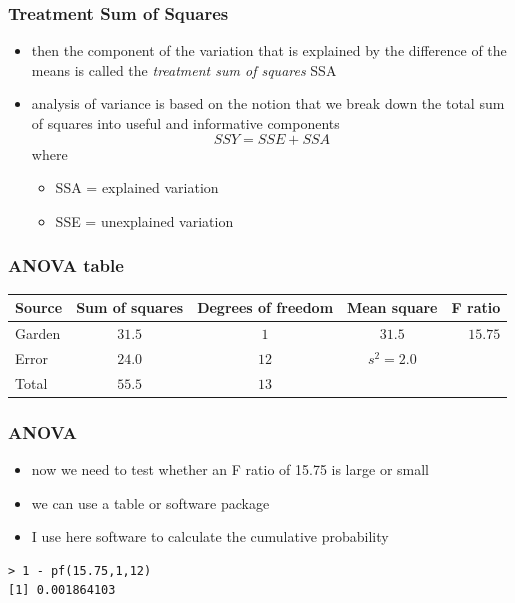 \begin{frame}\frametitle{Treatment Sum of Squares}
\begin{itemize}
  \item then the component of the variation that is explained by the difference of the means is called the \emph{treatment sum of squares} SSA
  \item analysis of variance is based  on the notion that we break down the total sum of squares into useful and informative components
$$SSY=SSE+SSA$$ where
    \begin{itemize}
      \item SSA = explained variation
      \item SSE = unexplained variation
    \end{itemize}

  \end{itemize}
\end{frame}

\begin{frame}\frametitle{ANOVA table}
\begin{center}
\small
\begin{tabular}{@{} >{\ttfamily}l cccr}
\hline
Source & Sum of squares & Degrees of freedom & Mean square & F ratio \\
\hline
Garden &  $31.5$ & $1$ &  $31.5$ &  $15.75$\\
Error &  $24.0$ & $12$ &  $s^2=2.0$ &  \\
Total & $55.5$ & $13$ & & \\   \hline
\end{tabular}
\end{center}
\end{frame}


\begin{frame}[fragile]\frametitle{ANOVA}
  \begin{itemize}
  \item now we need to test whether an F ratio of 15.75 is large or small
  \item we can use a table or software package
  \item I use here software to calculate the cumulative probability
  \end{itemize}
\begin{verbatim}
> 1 - pf(15.75,1,12)
[1] 0.001864103
\end{verbatim}
\end{frame}

